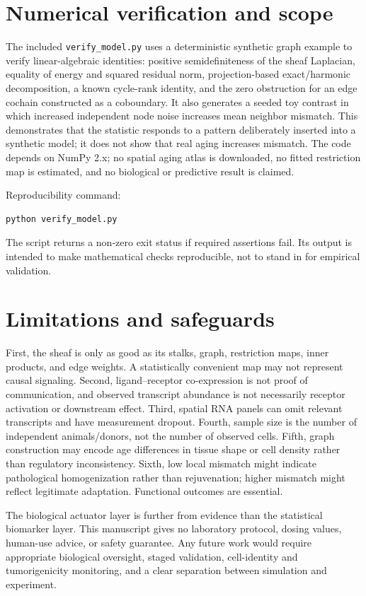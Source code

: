 \documentclass[11pt]{article}
\begin{document}
\section{Numerical verification and scope}
The included \texttt{verify\_model.py} uses a deterministic synthetic graph example to verify linear-algebraic identities: positive semidefiniteness of the sheaf Laplacian, equality of energy and squared residual norm, projection-based exact/harmonic decomposition, a known cycle-rank identity, and the zero obstruction for an edge cochain constructed as a coboundary. It also generates a seeded toy contrast in which increased independent node noise increases mean neighbor mismatch. This demonstrates that the statistic responds to a pattern deliberately inserted into a synthetic model; it does not show that real aging increases mismatch. The code depends on NumPy 2.x; no spatial aging atlas is downloaded, no fitted restriction map is estimated, and no biological or predictive result is claimed.

Reproducibility command:
\begin{verbatim}
python verify_model.py
\end{verbatim}
The script returns a non-zero exit status if required assertions fail. Its output is intended to make mathematical checks reproducible, not to stand in for empirical validation.

\section{Limitations and safeguards}
First, the sheaf is only as good as its stalks, graph, restriction maps, inner products, and edge weights. A statistically convenient map may not represent causal signaling. Second, ligand--receptor co-expression is not proof of communication, and observed transcript abundance is not necessarily receptor activation or downstream effect. Third, spatial RNA panels can omit relevant transcripts and have measurement dropout. Fourth, sample size is the number of independent animals/donors, not the number of observed cells. Fifth, graph construction may encode age differences in tissue shape or cell density rather than regulatory inconsistency. Sixth, low local mismatch might indicate pathological homogenization rather than rejuvenation; higher mismatch might reflect legitimate adaptation. Functional outcomes are essential.

The biological actuator layer is further from evidence than the statistical biomarker layer. This manuscript gives no laboratory protocol, dosing values, human-use advice, or safety guarantee. Any future work would require appropriate biological oversight, staged validation, cell-identity and tumorigenicity monitoring, and a clear separation between simulation and experiment.
\end{document}
